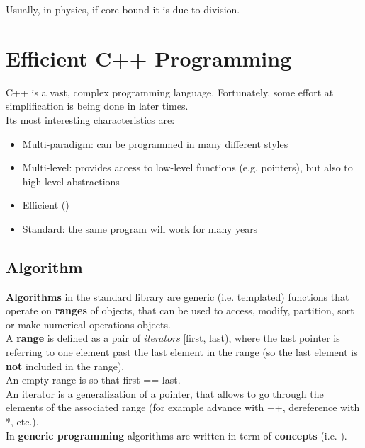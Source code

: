 \documentclass[../template.tex]{subfiles}
\begin{document}
Usually, in physics, if core bound it is due to division. 

\chapter{Efficient C++ Programming}
C++ is a vast, complex programming language. Fortunately, some effort at simplification is being done in later times.\\
Its most interesting characteristics are:
\begin{itemize}
    \item Multi-paradigm: can be programmed in many different styles
    \item Multi-level: provides access to low-level functions (e.g. pointers), but also to high-level abstractions
    \item Efficient ()
    \item Standard: the same program will work for many years
\end{itemize}

\section{Algorithm}
\textbf{Algorithms} in the standard library are generic (i.e. templated) functions that operate on \textbf{ranges}  of objects, that can be used to access, modify, partition, sort or make numerical operations objects.\\
A \textbf{range} is defined as a pair of \textit{iterators} [first, last), where the last pointer is referring to one element past the last element in the range (so the last element is \textbf{not} included in the range).\\
An empty range is so that first == last.\\
An iterator is a generalization of a pointer, that allows to go through the elements of the associated range (for example advance with ++, dereference with *, etc.).\\

In \textbf{generic programming} algorithms are written in term of \textbf{concepts} (i.e. ).  
\end{document}
